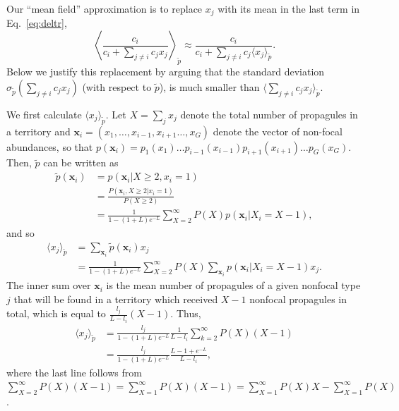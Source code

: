\documentclass[11pt]{article}
\begin{document}
Our ``mean field'' approximation is to replace $x_j$ with its mean in the last term in Eq.~\eqref{eq:deltr},
\begin{equation}
\left\langle\frac{c_i}{c_i +\sum_{j\neq i} c_j x_j}\right\rangle_{\tilde{p}}\approx \frac{c_i}{c_i +\sum_{j\neq i} c_j \langle x_j\rangle_{\tilde{p}}}.\label{eq:meanfieldr}
\end{equation}
Below we justify this replacement by arguing that the standard deviation $\sigma_{\tilde{p}}(\sum_{j\neq i} c_j x_j)$ (with respect to $\tilde{p}$), is much smaller than $\langle\sum_{j\neq i} c_j x_j\rangle_{\tilde{p}}$.

We first calculate $\langle x_j \rangle_{\tilde{p}}$. Let $X=\sum_j x_j$ denote the total number of propagules in a territory and ${\mathbf x_i}=(x_1,\ldots,x_{i-1},x_{i+1}\ldots,x_G)$ denote the vector of non-focal abundances, so that $p({\mathbf x_i})=p_1(x_1)\ldots p_{i-1}(x_{i-1})p_{i+1}(x_{i+1})\ldots p_G(x_G)$. Then, $\tilde{p}$ can be written as
\begin{align}
\tilde{p}({\mathbf x_i})&=p({\mathbf x_i}|X\geq 2,x_i=1)\nonumber\\
&=\frac{P({\mathbf x_i},X\geq 2|x_i=1)}{P(X\geq 2)}\nonumber\\
&=\frac{1}{1-(1+L)e^{-L}}\sum_{X=2}^{\infty} P(X) p({\mathbf x_i}|X_i=X-1),
\end{align}
and so
\begin{align}
\langle x_j \rangle_{\tilde{p}}&=\sum_{\mathbf x_i} \tilde{p}({\mathbf x_i})x_j\nonumber\\
&=\frac{1}{1-(1+L)e^{-L}}\sum_{X=2}^{\infty} P(X) \sum_{\mathbf x_i} p({\mathbf x_i}|X_i=X-1)x_j.
\label{eq:raremonster1}
\end{align}
The inner sum over ${\mathbf x_i}$ is the mean number of propagules of a given nonfocal type $j$ that will be found in a territory which received $X-1$ nonfocal propagules in total, which is equal to $\frac{l_j}{L-l_i}(X-1)$. Thus, 
\begin{align}
\langle x_j \rangle_{\tilde{p}}&=\frac{l_j}{1-(1+L)e^{-L}}\frac{1}{L-l_i}\sum_{k=2}^{\infty} P(X) (X-1)\nonumber\\
&=\frac{l_j}{1-(1+L)e^{-L}}\frac{L-1+e^{-L}}{L-l_i},
\label{eq:meanxjrare}
\end{align}
where the last line follows from $\sum_{X=2}^{\infty} P(X)(X-1)=\sum_{X=1}^{\infty} P(X)(X-1)=\sum_{X=1}^{\infty} P(X)X-\sum_{X=1}^{\infty}P(X)$.
\end{document}
